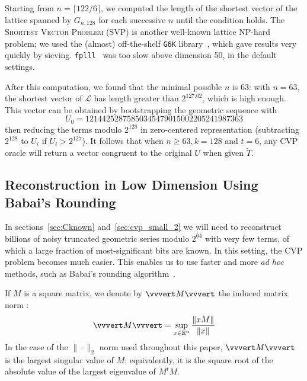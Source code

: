 \documentclass[journal=tosc,final]{iacrtrans}
\begin{document}
Starting from $n=\lceil 122/6\rceil$, we computed the length of the
shortest vector of the lattice spanned by $G_{n, 128}$ for each successive $n$
until the condition holds. The \textsc{Shortest Vector Problem} (SVP) is another
well-known lattice NP-hard problem; we used the (almost) off-the-shelf
\texttt{G6K} library~\cite{AlbrechtDHKPS19}, which gave results very quickly by
sieving. \texttt{fplll}~\cite{fplll} was too slow above dimension 50, in the
default settings.

After this computation, we found that the minimal possible $n$ is 63: with
$n=63$, the shortest vector of $\mathcal{L}$ has length greater than
$2^{127.02}$, which is high enough. This vector can be obtained by bootstrapping
the geometric sequence with
\[
  U_0 = 12144252875850345479015002205241987363
\]
then reducing the terms modulo $2^{128}$ in zero-centered representation
(subtracting $2^{128}$ to $U_i$ if $U_i > 2^{127}$). It follows that when
$n\geq 63, k=128$ and $t=6$, any CVP oracle will return a vector congruent to
the original $U$ when given $\widetilde{T}$.


\subsection{Reconstruction in Low Dimension Using Babai's Rounding}
\label{sec:cvp_small}

In sections~\ref{sec:Cknown} and~\ref{sec:cvp_small_2} we will need to
reconstruct billions of noisy truncated geometric series modulo $2^{64}$ with
very few terms, of which a large fraction of most-significant bits are known. In
this setting, the CVP problem becomes much easier. This enables us to use faster
and more \textit{ad hoc} methods, such as Babai's rounding
algorithm~\cite{Babai86}.

If $M$ is a square matrix, we denote by $\vvvert M \vvvert$ the induced matrix norm :
\[
  \vvvert M \vvvert =  \sup_{x \in \mathbb{R}^n} \frac{\| xM \|}{\| x \|}
\]
In the case of the $\| \cdot \|_2$ norm used throughout this paper, $\vvvert M \vvvert$ is
the largest singular value of $M$; equivalently, it is the square root of the
absolute value of the largest eigenvalue of $M^{t} M$.
\end{document}
